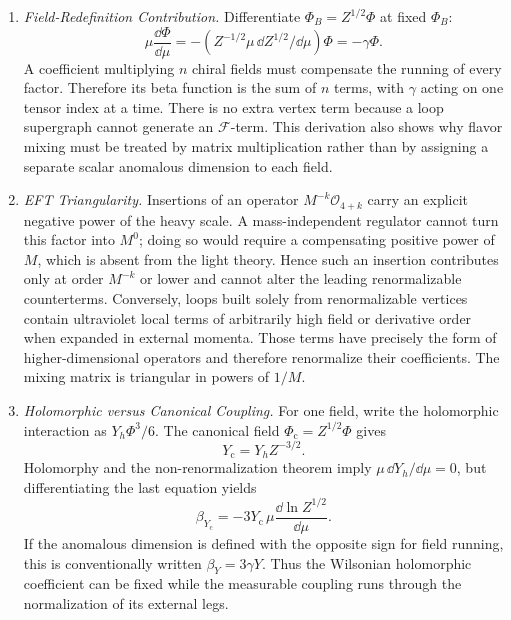 \begin{enumerate}
  \begin{enumerate}
    \item \emph{Field-Redefinition Contribution.}
    Differentiate
      \(\Phi_B=Z^{1/2}\Phi\) at fixed \(\Phi_B\):
      \[
        \mu\frac{\dd\Phi}{\dd\mu}
          =-(Z^{-1/2}\mu\,\dd Z^{1/2}/\dd\mu)\Phi
          =-\gamma\Phi .
      \]
      A coefficient multiplying \(n\) chiral fields must compensate the
      running of every factor.  Therefore its beta function is the sum of
      \(n\) terms, with \(\gamma\) acting on one tensor index at a time.
      There is no extra vertex term because a loop supergraph cannot
      generate an \(\mathcal F\)-term.  This derivation also shows why
      flavor mixing must be treated by matrix multiplication rather than
      by assigning a separate scalar anomalous dimension to each field.
    \item \emph{EFT Triangularity.}
    Insertions of an operator \(M^{-k}\mathcal O_{4+k}\) carry an explicit
      negative power of the heavy scale.  A mass-independent regulator
      cannot turn this factor into \(M^0\); doing so would require a
      compensating positive power of \(M\), which is absent from the light
      theory.  Hence such an insertion contributes only at order \(M^{-k}\)
      or lower and cannot alter the leading renormalizable counterterms.
      Conversely, loops built solely from renormalizable vertices contain
      ultraviolet local terms of arbitrarily high field or derivative
      order when expanded in external momenta.  Those terms have precisely
      the form of higher-dimensional operators and therefore renormalize
      their coefficients.  The mixing matrix is triangular in powers of
      \(1/M\).
    \item \emph{Holomorphic versus Canonical Coupling.}
    For one field, write the holomorphic interaction as
      \(Y_h\Phi^3/6\).  The canonical field
      \(\Phi_{\mathrm c}=Z^{1/2}\Phi\) gives
      \[
        Y_{\mathrm c}=Y_hZ^{-3/2}.
      \]
      Holomorphy and the non-renormalization theorem imply
      \(\mu\,\dd Y_h/\dd\mu=0\), but differentiating the last equation yields
      \[
        \beta_{Y_{\mathrm c}}
          =-3Y_{\mathrm c}\,
           \mu\frac{\dd\ln Z^{1/2}}{\dd\mu}.
      \]
      If the anomalous dimension is defined with the opposite sign for
      field running, this is conventionally written
      \(\beta_Y=3\gamma Y\).  Thus the Wilsonian holomorphic coefficient can
      be fixed while the measurable coupling runs through the normalization
      of its external legs.
  \end{enumerate}


\end{enumerate}
